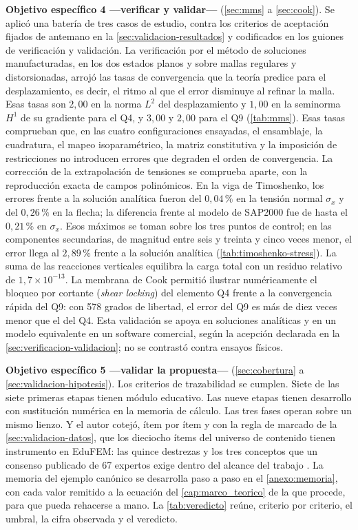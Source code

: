 \textbf{Objetivo específico 4 —verificar y validar—} (\autoref{sec:mms} a \autoref{sec:cook}). Se aplicó una batería de tres casos de estudio, contra los criterios de aceptación fijados de antemano en la \autoref{sec:validacion-resultados} y codificados en los guiones de verificación y validación. La verificación por el método de soluciones manufacturadas, en los dos estados planos y sobre mallas regulares y distorsionadas, arrojó las tasas de convergencia que la teoría predice para el desplazamiento, es decir, el ritmo al que el error disminuye al refinar la malla. Esas tasas son $2{,}00$ en la norma $L^2$ del desplazamiento y $1{,}00$ en la seminorma $H^1$ de su gradiente para el Q4, y $3{,}00$ y $2{,}00$ para el Q9 (\autoref{tab:mms}). Esas tasas comprueban que, en las cuatro configuraciones ensayadas, el ensamblaje, la cuadratura, el mapeo isoparamétrico, la matriz constitutiva y la imposición de restricciones no introducen errores que degraden el orden de convergencia. La corrección de la extrapolación de tensiones se comprueba aparte, con la reproducción exacta de campos polinómicos. En la viga de Timoshenko, los errores frente a la solución analítica fueron del $0{,}04\,\%$ en la tensión normal $\sigma_x$ y del $0{,}26\,\%$ en la flecha; la diferencia frente al modelo de SAP2000 fue de hasta el $0{,}21\,\%$ en $\sigma_x$. Esos máximos se toman sobre los tres puntos de control; en las componentes secundarias, de magnitud entre seis y treinta y cinco veces menor, el error llega al $2{,}89\,\%$ frente a la solución analítica (\autoref{tab:timoshenko-stress}). La suma de las reacciones verticales equilibra la carga total con un residuo relativo de $1{,}7\times10^{-13}$. La membrana de Cook permitió ilustrar numéricamente el bloqueo por cortante (\emph{shear locking}) del elemento Q4 frente a la convergencia rápida del Q9: con 578 grados de libertad, el error del Q9 es más de diez veces menor que el del Q4. Esta validación se apoya en soluciones analíticas y en un modelo equivalente en un software comercial, según la acepción declarada en la \autoref{sec:verificacion-validacion}; no se contrastó contra ensayos físicos.

\textbf{Objetivo específico 5 —validar la propuesta—} (\autoref{sec:cobertura} a \autoref{sec:validacion-hipotesis}). Los criterios de trazabilidad se cumplen. Siete de las siete primeras etapas tienen módulo educativo. Las nueve etapas tienen desarrollo con sustitución numérica en la memoria de cálculo. Las tres fases operan sobre un mismo lienzo. Y el autor cotejó, ítem por ítem y con la regla de marcado de la \autoref{sec:validacion-datos}, que los dieciocho ítems del universo de contenido tienen instrumento en EduFEM: las quince destrezas y los tres conceptos que un consenso publicado de 67 expertos exige dentro del alcance del trabajo \autocite[pp.~1162-1163]{perezsantiago2023fem}. La memoria del ejemplo canónico se desarrolla paso a paso en el \autoref{anexo:memoria}, con cada valor remitido a la ecuación del \autoref{cap:marco_teorico} de la que procede, para que pueda rehacerse a mano. La \autoref{tab:veredicto} reúne, criterio por criterio, el umbral, la cifra observada y el veredicto.

